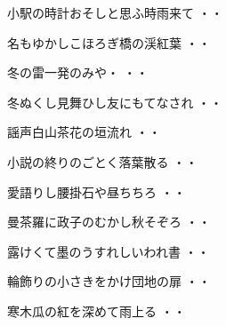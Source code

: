 \begin{shiika}小駅の時計おそしと思ふ時雨来て
\hfill{・・}\end{shiika}
\vspace{0.6cm}
\begin{shiika}名もゆかしこほろぎ橋の渓紅葉
\hfill{・・}\end{shiika}
\vspace{0.6cm}
\begin{shiika}冬の雷一発のみや・
\hfill{・・}\end{shiika}
\vspace{0.6cm}
\begin{shiika}冬ぬくし見舞ひし友にもてなされ
\hfill{・・}\end{shiika}
\vspace{0.6cm}
\begin{shiika}謡声白山茶花の垣流れ
\hfill{・・}\end{shiika}
\vspace{0.6cm}
\begin{shiika}小説の終りのごとく落葉散る
\hfill{・・}\end{shiika}
\vspace{0.6cm}
\begin{shiika}愛語りし腰掛石や昼ちちろ
\hfill{・・}\end{shiika}
\vspace{0.6cm}
\begin{shiika}曼茶羅に政子のむかし秋そぞろ
\hfill{・・}\end{shiika}
\vspace{0.6cm}
\begin{shiika}露けくて墨のうすれしいわれ書
\hfill{・・}\end{shiika}
\vspace{0.6cm}
\begin{shiika}輪飾りの小さきをかけ団地の扉
\hfill{・・}\end{shiika}
\vspace{0.6cm}
\begin{shiika}寒木瓜の紅を深めて雨上る
\hfill{・・}\end{shiika}
\vspace{0.6cm}
